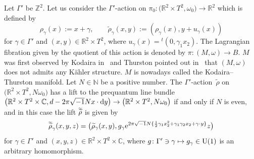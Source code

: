 \documentclass[pdftex]{sigma}
\numberwithin{equation}{section}
\newcommand{\C}{\mathbb{C}}
\newcommand{\R}{\mathbb{R}}
\newcommand{\Z}{\mathbb{Z}}
\newcommand{\N}{\mathbb{N}}
\renewcommand{\tilde}{\widetilde}
\newcommand{\vardbtilde}[1]{\tilde{\raisebox{0pt}[0.85\height]{$\tilde{#1}$}}}
\begin{document}
\begin{Example}\label{Kodaira--Thurston}
Let $\Gamma'$ be $\Z^2$. Let us consider the $\Gamma'$-action on $\pi_0\colon \bigl(\R^2\times T^2,\omega_0\bigr)\to \R^2$ which is defined by
\[
\rho_\gamma(x):=x+\gamma,\qquad \tilde \rho_\gamma (x,y):=(\rho_\gamma(x), y+u_\gamma (x))
\]
for $\gamma \in \Gamma'$ and $(x,y)\in \R^2\times T^2$, where $u_\gamma (x)={}^t(0,\gamma_1x_2)$. The Lagrangian fibration given by the quotient of this action is denoted by $\pi\colon (M,\omega)\to B$. $M$ was first observed by Kodaira in~\cite{Kodaira} and Thurston pointed out in~\cite{Thurston} that $(M,\omega)$ does not admits any K\"ahler structure. $M$ is nowadays called the Kodaira--Thurston manifold.
%
Let $N\in \N$ be a positive number. The $\Gamma'$-action~${\tilde \rho}$ on $\bigl(\R^2\times T^2, N\omega_0\bigr)$ has a lift to the prequantum line bundle $\bigl(\R^2\times T^2\times \C, d-2\pi\sqrt{-1}Nx\cdot {\rm d}y\bigr)\to \bigl(\R^2\times T^2,N\omega_0\bigr)$ if and only if $N$ is even, and in this case the lift ${\vardbtilde \rho}$ is given by
\[
{\vardbtilde \rho}_\gamma (x,y,z)=\bigl({\tilde \rho}_\gamma (x,y), g_\gamma {\rm e}^{2\pi\sqrt{-1}N\{\frac{1}{2}\gamma_1x_2^2+\gamma_1\gamma_2x_2+\gamma\cdot y\}}z\bigr)
\]
for $\gamma\in \Gamma'$ and $(x,y,z)\in \R^2\times T^2\times \C$, where $g\colon \Gamma' \ni \gamma\mapsto g_\gamma\in {\rm U}(1)$ is an arbitrary homomorphism.
\end{Example}
\end{document}
